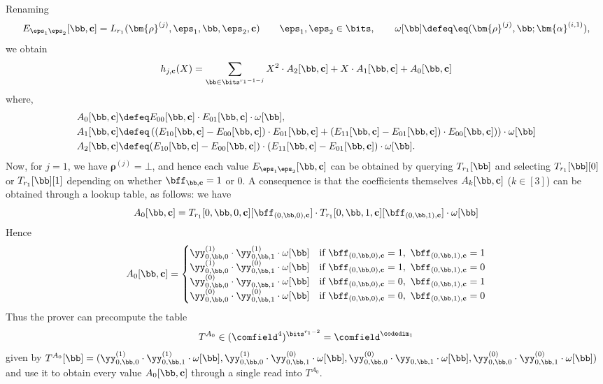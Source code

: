 %
Renaming
%
$$
E_{\eps_1\eps_2}[\bb,\cc] = L_{r_1}(\bm{\rho}^{(j)}, \eps_1, \bb, \eps_2,\cc) \qquad \eps_1,\eps_2\in \bits, \qquad \omega[\bb]\defeq \eq(\bm{\rho}^{(j)}, \bb;\bm{\alpha}^{(i,1)}),
$$
we obtain
%
$$
h_{j,\cc}(X) =\sum_{\bb\in \bits^{r_1-1-j}} X^2 \cdot A_2[\bb,\cc] + X\cdot A_1[\bb,\cc] + A_0[\bb,\cc]
$$
 where,   
$$
\begin{aligned}
A_0[\bb,\cc] &\defeq E_{00}[\bb,\cc]\cdot E_{01} [\bb,\cc]\cdot \omega[\bb],\\ 
A_1[\bb,\cc] &\defeq  \left((E_{10}[\bb,\cc]-E_{00}[\bb,\cc])\cdot E_{01}[\bb,\cc] + (E_{11}[\bb,\cc]-E_{01}[\bb,\cc])\cdot E_{00}[\bb,\cc]\right) )\cdot \omega[\bb]\\
A_2[\bb,\cc] &\defeq (E_{10}[\bb,\cc]-E_{00}[\bb,\cc])\cdot (E_{11}[\bb,\cc]-E_{01}[\bb,\cc])\cdot \omega[\bb].
\end{aligned}
$$
%
Now, for $j=1$, we have $\bm{\rho}^{(j)}= \bot$, and hence each value $E_{\eps_1\eps_2}[\bb,\cc]$ can be obtained by querying $T_{r_1}[\bb]$ and selecting $T_{r_1}[\bb][0]$ or $T_{r_1}[\bb][1]$  depending on whether $\bff_{\bb,\cc} = 1$ or $0$. A consequence  is that  the coefficients themselves $A_k[\bb,\cc]$ ($k\in [3]$) can be obtained through a lookup table, as follows:
%
 we have $$A_0[\bb,\cc] = 
    T_{r_1}[0,\bb,0,\cc][\bff_{(0,\bb,0),\cc}] \cdot    T_{r_1}[0,\bb, 1,\cc][\bff_{(0,\bb,1),\cc}] \cdot \omega[\bb]
$$
Hence
%
$$
A_0[\bb,\cc] = \begin{cases}
    \yy_{0,\bb,0}^{(1)} \cdot  \yy_{0,\bb,1}^{(1)} \cdot \omega[\bb]&\text{if } \bff_{(0,\bb,0),\cc}=1,\ \bff_{(0,\bb,1),\cc}=1 \\  
    \yy_{0,\bb,0}^{(1)} \cdot  \yy_{0,\bb,1}^{(0)}\cdot \omega[\bb]&\text{if } \bff_{(0,\bb,0),\cc}=1,\ \bff_{(0,\bb,1),\cc}=0\\
     \yy_{0,\bb,0}^{(0)} \cdot  \yy_{0,\bb,1}\cdot \omega[\bb]& \text{if } \bff_{(0,\bb,0),\cc}=0,\ \bff_{(0,\bb,1),\cc}=1 \\
    \yy_{0,\bb,0}^{(0)} \cdot  \yy_{0,\bb,1}^{(0)} \cdot  \omega[\bb] &\text{if } \bff_{(0,\bb,0),\cc}= 0,\  \bff_{(0,\bb,1),\cc}=0
\end{cases}
$$
%
Thus the prover can precompute the table $$T^{A_0} \in (\comfield^{4})^{\bits^{r_1-2}}=\comfield^{\codedim_1}$$ given by $T^{A_0}[\bb]=(\yy_{0,\bb,0}^{(1)} \cdot  \yy_{0,\bb,1}^{(1)} \cdot \omega[\bb],  
    \yy_{0,\bb,0}^{(1)} \cdot  \yy_{0,\bb,1}^{(0)}\cdot \omega[\bb],  \yy_{0,\bb,0}^{(0)} \cdot  \yy_{0,\bb,1}\cdot \omega[\bb],  \yy_{0,\bb,0}^{(0)} \cdot  \yy_{0,\bb,1}^{(0)} \cdot  \omega[\bb])$
and use it to obtain every value $A_{0}[\bb,\cc]$ through a single read into $T^{A_0}$. %

